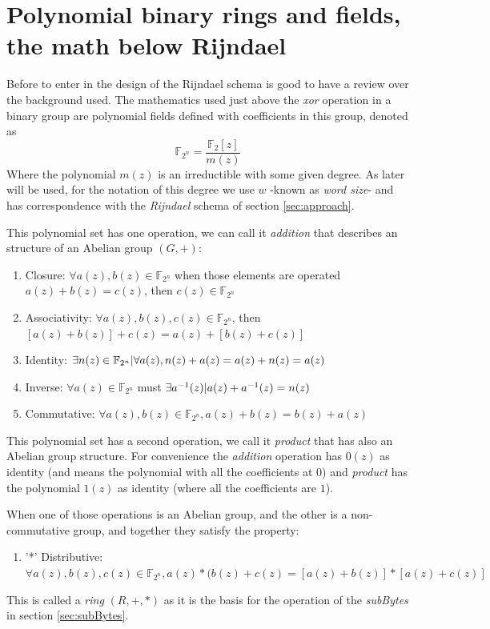\documentclass[10pt,a4paper,twoside]{llncs}
\newcommand{\Fpn}[2]{\ensuremath{\mathbb{F}_{#1^#2}}}
\begin{document}
\section{Polynomial binary rings and fields, the math below Rijndael}\label{sec:math}
Before to enter in the design of the Rijndael schema is good to have a review over the background used. The mathematics used just above the \emph{xor} operation in a binary group are polynomial fields defined with coefficients in this group, denoted as
\begin{equation}\label{eq:polynomialField} 
\Fpn{2}{n}=\frac{\mathbb{F}_{2}[z]}{m(z)}
\end{equation}
Where the polynomial $m(z)$ is an irreductible with some given degree. As later will be used, for the notation of this degree we use $w$ -known as \emph{word size}- and has correspondence with the \emph{Rijndael} schema of section \ref{sec:approach}.

This polynomial set has one operation, we can call it \emph{addition} that describes an structure of an Abelian group $(G,+)$:
\begin{enumerate}
 \item Closure: $\forall a(z),b(z) \in \Fpn{2}{n}$ when those elements are operated $a(z)+b(z)=c(z)$, then $c(z) \in \Fpn{2}{n}$
 \item Associativity: $\forall a(z),b(z),c(z) \in \Fpn{2}{n}$, then $[a(z)+b(z)]+c(z)=a(z)+[b(z)+c(z)]$
 \item Identity: $\exists n(z) \in \Fpn{2}{n} \arrowvert \forall a(z), n(z)+a(z)=a(z)+n(z)=a(z)$
 \item Inverse: $\forall a(z) \in \Fpn{2}{n}$ must $\exists a^{-1}(z) \arrowvert a(z)+a^{-1}(z) = n(z)$
 \item Commutative: $\forall a(z),b(z) \in \Fpn{2}{n}, a(z)+b(z)=b(z)+a(z)$
\end{enumerate}

This polynomial set has a second operation, we call it \emph{product} that has also an Abelian group structure. For convenience the \emph{addition} operation has $0(z)$ as identity (and means the polynomial with all the coefficients at $0$) and \emph{product} has the polynomial $1(z)$ as identity (where all the coefficients are $1$).

When one of those operations is an Abelian group, and the other is a non-commutative group, and together they satisfy the property:
\begin{enumerate}
 \item '*' Distributive: $\forall a(z),b(z),c(z) \in \Fpn{2}{n}, a(z)*(b(z)+c(z)=[a(z)+b(z)]*[a(z)+c(z)]$
\end{enumerate}
This is called a \emph{ring} $(R,+,*)$ as it is the basis for the operation of the \emph{subBytes} in section \ref{sec:subBytes}.
\end{document}
